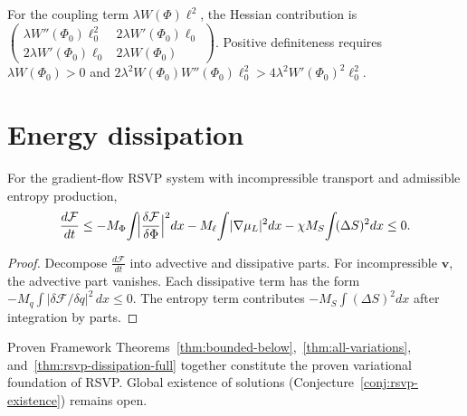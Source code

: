 \begin{proposition}
  \label{prop:stability-coupling}
  For the coupling term $\lambda W(\Phi)\ell^2$,
  the Hessian contribution is
  $\begin{pmatrix}
    \lambda W''(\Phi_0)\ell_0^2 & 2\lambda W'(\Phi_0)\ell_0 \\
    2\lambda W'(\Phi_0)\ell_0 & 2\lambda W(\Phi_0)
  \end{pmatrix}$.
  Positive definiteness requires
  $\lambda W(\Phi_0) > 0$ and
  $2\lambda^2 W(\Phi_0)W''(\Phi_0)\ell_0^2 > 4\lambda^2 W'(\Phi_0)^2\ell_0^2$.
\end{proposition}

\section{Energy dissipation}

\begin{theorem}
  \label{thm:rsvp-dissipation-full}
  \statusproven{}
  For the gradient-flow RSVP system with incompressible
  transport and admissible entropy production,
  \[
    \frac{d\mathcal{F}}{dt}
    \leq -M_\Phi\!\int\!\Bigl|\frac{\delta\mathcal{F}}{\delta\Phi}\Bigr|^2 dx
    - M_\ell\!\int\!|\nabla\mu_L|^2 dx
    - \chi M_S\!\int\!(\Delta S)^2 dx \leq 0.
  \]
\end{theorem}

\begin{proof}
  Decompose $\frac{d\mathcal{F}}{dt}$ into advective and
  dissipative parts.
  For incompressible $\mathbf{v}$, the advective part vanishes.
  Each dissipative term has the form
  $-M_q\int|\delta\mathcal{F}/\delta q|^2\,dx \leq 0$.
  The entropy term contributes $-M_S\int(\Delta S)^2 dx$
  after integration by parts.
\end{proof}

\begin{StatusBox}{Proven Framework}
  Theorems~\ref{thm:bounded-below},~\ref{thm:all-variations},
  and~\ref{thm:rsvp-dissipation-full} together constitute the
  proven variational foundation of RSVP\@.
  Global existence of solutions (Conjecture~\ref{conj:rsvp-existence})
  remains open.
\end{StatusBox}

